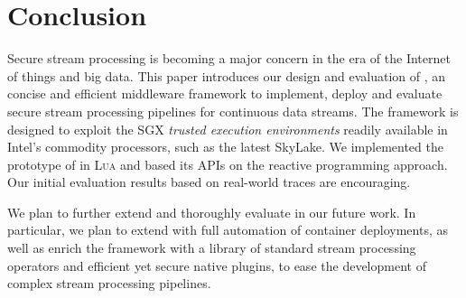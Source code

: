 \section{Conclusion}
\label{sec:conclusion}

Secure stream processing is becoming a major concern in the era of the Internet of things and big data.
This paper introduces our design and evaluation of \SYS{}, an concise and efficient middleware framework to implement, deploy and evaluate secure stream processing pipelines for continuous data streams.
The framework is designed to exploit the SGX \emph{trusted execution environments} readily available in Intel's commodity processors, such as the latest SkyLake.
We implemented the prototype of \SYS{} in \textsc{Lua} and based its APIs on the reactive programming approach.
Our initial evaluation results based on real-world traces are encouraging.

We plan to further extend and thoroughly evaluate \SYS in our future work.
In particular, we plan to extend \SYS with full automation of container deployments, as well as enrich the framework with a library of standard stream processing operators and efficient yet secure native plugins, to ease the development of complex stream processing pipelines.
